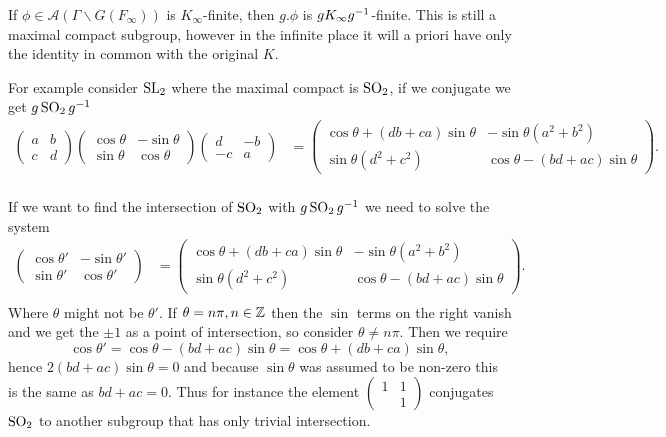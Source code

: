 \begin{example}
    If \(\phi\in \mathcal{A}(\Gamma \backslash G(F_\infty))\) is \(K_\infty\)-finite, then \(g.\phi\) is \(gK_\infty g^{-1}\)-finite. This is still a maximal compact subgroup, however in the infinite place it will a priori have only the identity in common with the original \(K\).

    For example consider \(\operatorname{SL}_2\) where the maximal compact is \(\operatorname{SO}_2\), if we conjugate we get \(g\operatorname{SO}_2g^{-1}\)
    \begin{align*}
        \begin{pmatrix}
            a & b\\
            c & d
        \end{pmatrix}
        \begin{pmatrix}
            \cos\theta & -\sin\theta \\
            \sin\theta & \cos\theta
        \end{pmatrix}
        \begin{pmatrix}
            d & -b\\
            -c & a
        \end{pmatrix}  &=  \begin{pmatrix}
            \cos\theta + (db  + ca)\sin\theta & -\sin\theta( a^2+b^2)\\
            \sin\theta(d^2 + c^2) & \cos\theta - (b d  + ac)\sin\theta
        \end{pmatrix}.\\
    \end{align*}

    If we want to find the intersection of \(\operatorname{SO}_2\) with \(g\operatorname{SO}_2 g^{-1}\) we need to solve the system 
    \begin{align*}
        \begin{pmatrix}
            \cos\theta' & -\sin\theta' \\
            \sin\theta' & \cos\theta'
        \end{pmatrix}  &=  \begin{pmatrix}
            \cos\theta + (db  + ca)\sin\theta & -\sin\theta( a^2+b^2)\\
            \sin\theta(d^2 + c^2) & \cos\theta - (b d  + ac)\sin\theta
        \end{pmatrix}.\\
    \end{align*}
    Where \(\theta\) might not be \(\theta'\). If \(\theta = n\pi, n\in \Z\) then the \(\sin\) terms on the right vanish and we get the \(\pm 1\) as a point of intersection, so consider \(\theta\neq n\pi\). Then we require 
    \[\cos\theta' = \cos\theta - (b d  + ac)\sin\theta = \cos\theta + (db  + ca)\sin\theta,\]
    hence \(2(bd+ac)\sin\theta = 0\) and because \(\sin\theta\) was assumed to be non-zero this is the same as \(bd+ac = 0\). Thus for instance the element \(\begin{pmatrix} 1 & 1\\ & 1  \end{pmatrix}\) conjugates \(\operatorname{SO}_2\) to another subgroup that has only trivial intersection. 


\end{example}
